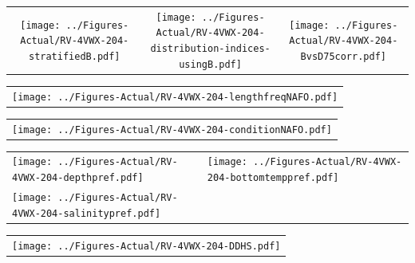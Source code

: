 \documentclass[12pt]{article}\usepackage[]{graphicx}\usepackage[]{color}
\begin{document}
\vspace{1cm}
\begin{minipage}{1.0\textwidth}
 \begin{tabular}{ccc}
\texttt{[image: ../Figures-Actual/RV-4VWX-204-stratifiedB.pdf]} & 
\texttt{[image: ../Figures-Actual/RV-4VWX-204-distribution-indices-usingB.pdf]} & 
\texttt{[image: ../Figures-Actual/RV-4VWX-204-BvsD75corr.pdf]} \\ 
\end{tabular} 
\end{minipage}
\clearpage
\begin{minipage}{1.0\textwidth}
 \begin{tabular}{c}
\texttt{[image: ../Figures-Actual/RV-4VWX-204-lengthfreqNAFO.pdf]} \\ 
\end{tabular} 
\end{minipage}
\newline

\vspace{1cm}
\begin{minipage}{1.0\textwidth}
 \begin{tabular}{c}
\texttt{[image: ../Figures-Actual/RV-4VWX-204-conditionNAFO.pdf]} \\ 
\end{tabular} 
\end{minipage}
\clearpage
\begin{minipage}{1.0\textwidth}
 \begin{tabular}[t]{m{3in}m{3in}}
\texttt{[image: ../Figures-Actual/RV-4VWX-204-depthpref.pdf]} & 
\texttt{[image: ../Figures-Actual/RV-4VWX-204-bottomtemppref.pdf]} \\ 
\texttt{[image: ../Figures-Actual/RV-4VWX-204-salinitypref.pdf]} & 
 \\ 
\end{tabular} 
\end{minipage}
\newline

\vspace{1cm}
\begin{minipage}{1.0\textwidth}
 \begin{tabular}{c}
\texttt{[image: ../Figures-Actual/RV-4VWX-204-DDHS.pdf]} \\ 
\end{tabular} 
\end{minipage}
\clearpage
\end{document}

